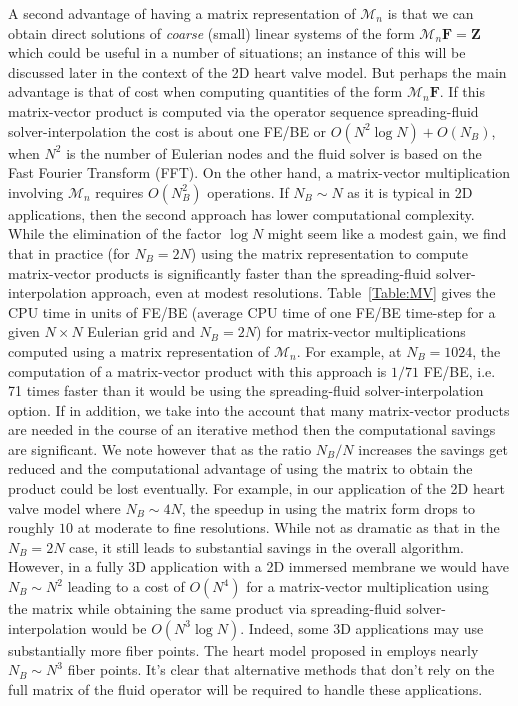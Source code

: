 \documentclass[preprint,12pt]{elsarticle}
\begin{document}
 A second advantage of having a matrix representation of $\mathcal{M}_n$ is that we can obtain direct solutions of {\em coarse} (small) linear systems of the form $\mathcal{M}_n\mathbf{F}=\mathbf{Z}$ which could be useful in a number of situations; an instance of this will be discussed later in the context of the 2D heart valve model. But perhaps the main advantage is that of cost when 
 computing quantities of the form  $\mathcal{M}_n\mathbf{F}$.  If this matrix-vector product is computed via the operator sequence  spreading-fluid solver-interpolation the cost is about one FE/BE or $O(N^2\log N) + O(N_B)$, when $N^2$ is the number of Eulerian nodes and the fluid solver is based on the Fast Fourier Transform (FFT).  
 On the other hand, a matrix-vector multiplication involving $\mathcal{M}_n$ requires $O(N_B^2)$ operations.  If  $N_B \sim N$ as it is typical in 2D applications, then the second approach has lower computational complexity. While
 the elimination of the factor $\log N$ might seem like a modest gain, we find that in practice (for $N_B=2N$) using the 
 matrix representation to compute matrix-vector products is significantly faster  than the spreading-fluid solver-interpolation approach, even at modest resolutions.  Table~\ref{Table:MV} gives the CPU time in units of FE/BE (average CPU time of one FE/BE time-step for a given $N\times N$ Eulerian grid and $N_B=2N$) for matrix-vector multiplications computed using a matrix representation of  $\mathcal{M}_n$.  For example, at $N_B=1024$,  the computation of a matrix-vector product with this approach is $1/71$ FE/BE, i.e.
  71 times faster than it would be using the spreading-fluid solver-interpolation option.
  If in addition,  we take into the account that many matrix-vector products are needed in the course of an iterative method then the computational savings are significant. We note however that as the ratio $N_B/N$ increases the savings get reduced and the computational advantage of using the matrix to obtain the product could be lost eventually. For example, in our application of the 2D heart valve model where $N_B  \sim 4N$, the speedup in using the matrix form drops to roughly $10$ at moderate to fine resolutions. While not as dramatic as that in the $N_B=2N$ case, it still leads to substantial savings in the overall algorithm.  However, 
  in a fully 3D application with a 2D immersed membrane we would have $N_B \sim N^2$ leading to a cost of  $O(N^4)$ for 
   a matrix-vector multiplication using the matrix  while obtaining the same product via spreading-fluid solver-interpolation would be $O(N^3\log N)$. Indeed, some 3D applications may use substantially more fiber points. The heart model proposed in	\cite{McQueenPeskin2000} employs nearly $N_B  \sim N^3$ fiber points. It's clear that alternative methods that don't rely on the full matrix of the fluid operator will be required to handle these applications.
  
\end{document}
